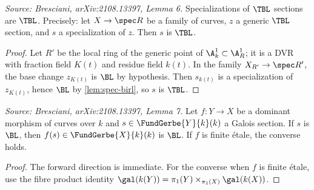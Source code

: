 \begin{lemma}[SpecTBirat]
  \label{lem:spec-tbirl}
  \textit{Source: Bresciani, arXiv:2108.13397, Lemma 6.}
  Specializations of \(\TBL\) sections are \(\TBL\). Precisely: let
  \(X \to \spec R\) be a family of curves, \(z\) a generic \(\TBL\) section, and
  \(s\) a specialization of \(z\). Then \(s\) is \(\TBL\).
\end{lemma}

\begin{proof}
  Let \(R'\) be the local ring of the generic point of \(\A^1_k \subset \A^1_R\); it
  is a DVR with fraction field \(K(t)\) and residue field \(k(t)\). In the family
  \(X_{R'} \to \spec R'\), the base change \(z_{K(t)}\) is \(\BL\) by hypothesis.
  Then \(s_{k(t)}\) is a specialization of \(z_{K(t)}\), hence \(\BL\) by
  \cref{lem:spec-birl}, so \(s\) is \(\TBL\).
\end{proof}

\begin{lemma}[MorphBirat]
  \label{lem:morph-birl}
  \textit{Source: Bresciani, arXiv:2108.13397, Lemma 7.}
  Let \(f : Y \to X\) be a dominant morphism of curves over \(k\) and
  \(s \in \FundGerbe{Y}{k}(k)\) a Galois section. If \(s\) is \(\BL\), then
  \(f(s) \in \FundGerbe{X}{k}(k)\) is \(\BL\). If \(f\) is finite étale, the
  converse holds.
\end{lemma}

\begin{proof}
  The forward direction is immediate. For the converse when \(f\) is finite étale,
  use the fibre product identity
  \(\gal(k(Y)) = \pi_1(Y) \times_{\pi_1(X)} \gal(k(X))\).
\end{proof}

